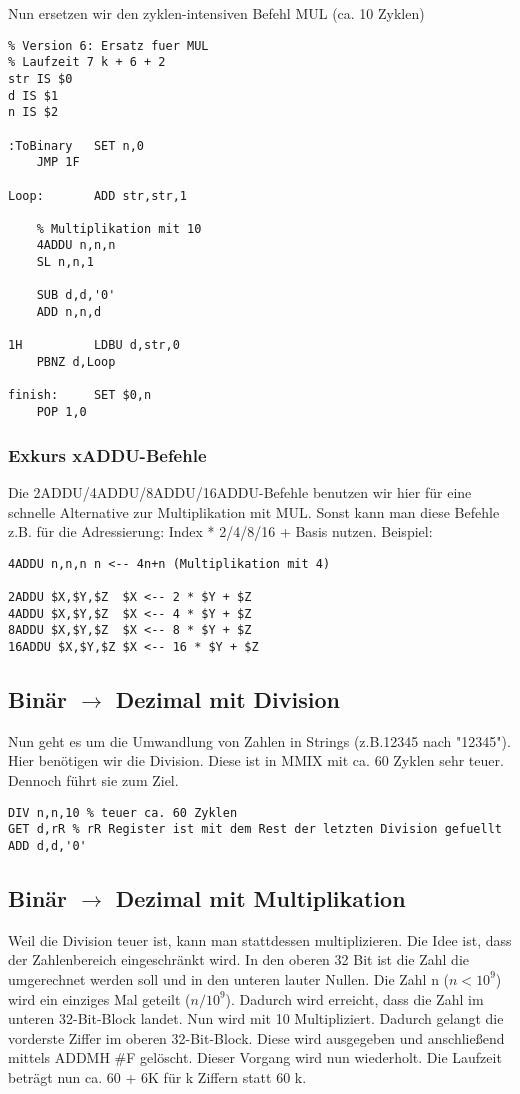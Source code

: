 Nun ersetzen wir den zyklen-intensiven Befehl MUL (ca. 10 Zyklen)
\begin{lstlisting}	
% Version 6: Ersatz fuer MUL
% Laufzeit 7 k + 6 + 2
str IS $0
d IS $1
n IS $2

:ToBinary	SET n,0
	JMP 1F

Loop:		ADD str,str,1

	% Multiplikation mit 10
	4ADDU n,n,n
	SL n,n,1

	SUB d,d,'0'
	ADD n,n,d

1H			LDBU d,str,0
	PBNZ d,Loop
			
finish:		SET $0,n
	POP 1,0
\end{lstlisting}

\subsubsection{Exkurs xADDU-Befehle} 
Die 2ADDU/4ADDU/8ADDU/16ADDU-Befehle benutzen wir hier für eine schnelle Alternative zur Multiplikation mit MUL. Sonst kann man diese Befehle z.B. für die Adressierung: Index * 2/4/8/16 + Basis nutzen. 
Beispiel: 
\begin{lstlisting}
4ADDU n,n,n	n <-- 4n+n (Multiplikation mit 4)

2ADDU $X,$Y,$Z	$X <-- 2 * $Y + $Z
4ADDU $X,$Y,$Z	$X <-- 4 * $Y + $Z
8ADDU $X,$Y,$Z	$X <-- 8 * $Y + $Z
16ADDU $X,$Y,$Z	$X <-- 16 * $Y + $Z
\end{lstlisting}

\subsection{Binär $ \rightarrow $ Dezimal mit Division}
Nun geht es um die Umwandlung von Zahlen in Strings (z.B.12345 nach "12345"). Hier benötigen wir die Division. Diese ist in MMIX mit ca. 60 Zyklen sehr teuer. Dennoch führt sie zum Ziel. 

\begin{lstlisting}
DIV n,n,10 % teuer ca. 60 Zyklen
GET d,rR % rR Register ist mit dem Rest der letzten Division gefuellt
ADD d,d,'0'
\end{lstlisting}

\subsection{Binär $ \rightarrow $ Dezimal mit Multiplikation}
Weil die Division teuer ist, kann man stattdessen multiplizieren. Die Idee ist, dass der Zahlenbereich eingeschränkt wird.  In den oberen 32 Bit ist die Zahl die umgerechnet werden soll und in den unteren lauter Nullen. Die Zahl n ($ n < 10^9 $) wird ein einziges Mal geteilt ($ n / 10^9 $). Dadurch wird erreicht, dass die Zahl im unteren 32-Bit-Block landet. Nun wird mit 10 Multipliziert.  Dadurch gelangt die vorderste Ziffer im oberen 32-Bit-Block. Diese wird ausgegeben und anschließend mittels ADDMH \#F gelöscht.  Dieser Vorgang wird nun wiederholt. Die Laufzeit beträgt nun ca. 60 + 6K für k Ziffern statt 60 k.